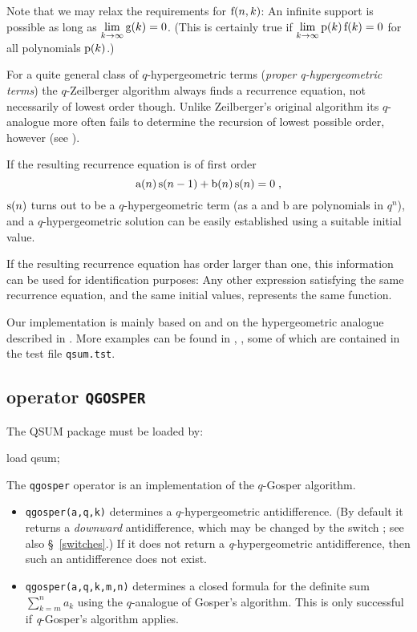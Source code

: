 Note that we may relax the requirements for ${\mathrm f}(n,k)$:
An infinite support is possible as long as
$\lim\limits_{k\rightarrow\infty}{{\mathrm g}(k)}=0$.
(This is certainly true if
$\lim\limits_{k\rightarrow\infty}{{\mathrm p}(k)\,{\mathrm f}(k)}=0$ for
all polynomials ${\mathrm p}(k)$.)

For a quite general class of $q$-hypergeometric terms
({\sl proper q-hypergeometric terms}) the $q$-Zeilberger algorithm
always finds a recurrence equation, not necessarily of lowest
order though. Unlike Zeilberger's original algorithm its
$q$-analogue more often fails to determine the recursion of
lowest possible order, however (see \cite{PauleRiese:95}).

If the resulting recurrence equation is of first order
\[
	{\mathrm a}(n)\,{\mathrm s}(n-1)+{\mathrm b}(n)\,{\mathrm s}(n)=0
\;,
\]
${\mathrm s}(n)$ turns out to be a $q$-hypergeometric term
(as a and b are polynomials in $q^n$),
and a $q$-hypergeometric solution can be easily established using a
suitable initial value.

If the resulting recurrence equation has order larger than one,
this information can be used for identification purposes:
Any other expression satisfying the same recurrence equation, and the same
initial values, represents the same function.

Our implementation is mainly based on \cite{Koornwinder:93} and on the
hypergeometric analogue described in \cite{Koepf:95e}.
More examples can be found in \cite{GasperRahman:90}, \cite{Gasper:95},
some of which are contained in the test file
\texttt{qsum.tst}.


\subsection{\REDUCE{} operator \texttt{QGOSPER}}
\label{reduce_qgosper}

The QSUM package must be loaded by:

\begin{redoutput}
\redprompt load qsum;
\end{redoutput}
The \texttt{qgosper} operator is an implementation of the $q$-Gosper
algorithm.
\begin{itemize}
	\item \texttt{qgosper(a,q,k)} determines a $q$-hypergeometric
		antidifference. (By default it returns a \textsl{downward}
		antidifference, which may be changed by the switch
		; see also
		\S~\ref{switches}.)
		If it does not return a \textsl{q}-hypergeometric antidifference,
		then such an antidifference does not exist.
	\item \texttt{qgosper(a,q,k,m,n)} determines a closed formula
		for the definite sum $\sum\limits_{k=m}^n a_k$ using the
		$q$-analogue of Gosper's algorithm.
		This is only successful if \textsl{q}-Gosper's algorithm applies.
\end{itemize}


